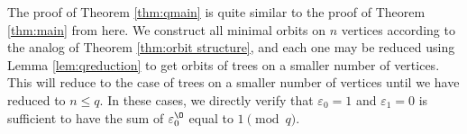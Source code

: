 The proof of Theorem \ref{thm:qmain} is quite similar to the proof of Theorem \ref{thm:main} from here. We construct all minimal orbits on $n$ vertices according to the analog of Theorem \ref{thm:orbit structure}, and each one may be reduced using Lemma \ref{lem:qreduction} to get orbits of trees on a smaller number of vertices. This will reduce to the case of trees on a smaller number of vertices until we have reduced to $n\leq q$. In these cases, we directly verify that $\varepsilon_0=1$ and $\varepsilon_1=0$ is sufficient to have the sum of $\varepsilon^{\O}_0$ equal to $1\pmod{q}$.